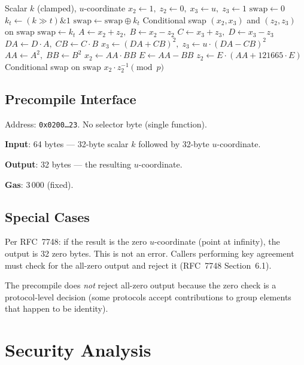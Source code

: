 \documentclass[11pt,a4paper]{article}
\begin{document}
\begin{algorithm}[H]
\caption{Montgomery ladder for X25519}\label{alg:ladder}
\begin{algorithmic}[1]
\Require Scalar $k$ (clamped), $u$-coordinate
\State $x_2 \gets 1, \; z_2 \gets 0, \; x_3 \gets u, \; z_3 \gets 1$
\State $\text{swap} \gets 0$
  \State $k_t \gets (k \gg t) \mathbin{\&} 1$
  \State $\text{swap} \gets \text{swap} \oplus k_t$
  \State Conditional swap $(x_2, x_3)$ and $(z_2, z_3)$ on $\text{swap}$
  \State $\text{swap} \gets k_t$
  \State $A \gets x_2 + z_2, \; B \gets x_2 - z_2$
  \State $C \gets x_3 + z_3, \; D \gets x_3 - z_3$
  \State $DA \gets D \cdot A, \; CB \gets C \cdot B$
  \State $x_3 \gets (DA + CB)^2, \; z_3 \gets u \cdot (DA - CB)^2$
  \State $AA \gets A^2, \; BB \gets B^2$
  \State $x_2 \gets AA \cdot BB$
  \State $E \gets AA - BB$
  \State $z_2 \gets E \cdot (AA + 121665 \cdot E)$
\EndFor
\State Conditional swap on $\text{swap}$
\State \Return $x_2 \cdot z_2^{-1} \pmod{p}$
\end{algorithmic}
\end{algorithm}

\subsection{Precompile Interface}

Address: \texttt{0x0200\ldots23}. No selector byte (single function).

\textbf{Input}: 64 bytes --- 32-byte scalar $k$ followed by 32-byte $u$-coordinate.

\textbf{Output}: 32 bytes --- the resulting $u$-coordinate.

\textbf{Gas}: 3\,000 (fixed).

\subsection{Special Cases}

Per RFC~7748: if the result is the zero $u$-coordinate (point at infinity),
the output is 32 zero bytes. This is not an error. Callers performing key
agreement must check for the all-zero output and reject it (RFC~7748 Section~6.1).

The precompile does \emph{not} reject all-zero output because the zero check
is a protocol-level decision (some protocols accept contributions to group
elements that happen to be identity).

\section{Security Analysis}
\end{document}
